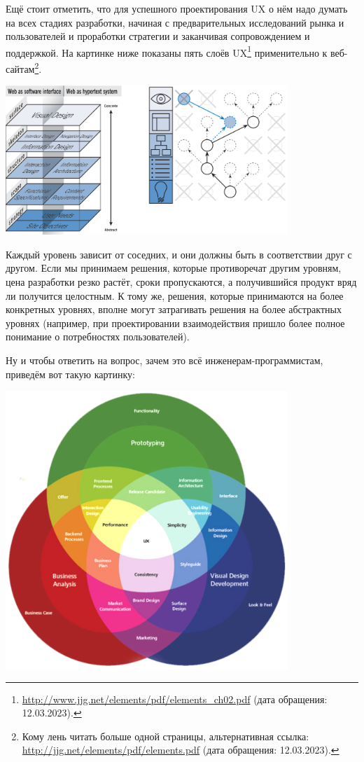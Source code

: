 \documentclass{../../text-style}
\begin{document}
Ещё стоит отметить, что для успешного проектирования UX о нём надо думать на всех стадиях разработки, начиная с предварительных исследований рынка и пользователей и проработки стратегии и заканчивая сопровождением и поддержкой. На картинке ниже показаны пять слоёв UX\footnote{\url{http://www.jjg.net/elements/pdf/elements_ch02.pdf} (дата обращения: 12.03.2023).} применительно к веб-сайтам\footnote{Кому лень читать больше одной страницы, альтернативная ссылка: \url{http://jjg.net/elements/pdf/elements.pdf} (дата обращения: 12.03.2023).}. 

\begin{center}
    \includegraphics[width=0.8\textwidth]{uxLayers.png}
\end{center}

Каждый уровень зависит от соседних, и они должны быть в соответствии друг с другом. Если мы принимаем решения, которые противоречат другим уровням, цена разработки резко растёт, сроки пропускаются, а получившийся продукт вряд ли получится целостным. К тому же, решения, которые принимаются на более конкретных уровнях, вполне могут затрагивать решения на более абстрактных уровнях (например, при проектировании взаимодействия пришло более полное понимание о потребностях пользователей).

Ну и чтобы ответить на вопрос, зачем это всё инженерам-программистам, приведём вот такую картинку:

\begin{center}
    \includegraphics[width=0.8\textwidth]{uxDesignPractices.png}
\end{center}
\end{document}
